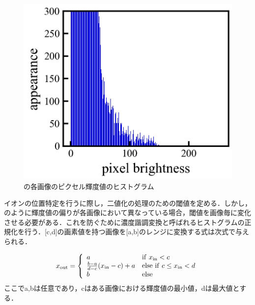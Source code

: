 \begin{figure}[h]
\begin{center}
\begin{minipage}{0.3\linewidth}
		\end{minipage}
		\begin{minipage}{0.3\linewidth}
			\includegraphics[width=0.98\columnwidth]{./theory/figure/5/hist_2.jpg}
		\end{minipage}
	\end{center}
	\caption{の各画像のピクセル輝度値のヒストグラム}
	\label{fig:hist}
\end{figure}

イオンの位置特定を行うに際し，二値化の処理のための閾値を定める．しかし，のように輝度値の偏りが各画像において異なっている場合，閾値を画像毎に変化させる必要がある．これを防ぐために濃度諧調変換と呼ばれるヒストグラムの正規化を行う．[c,d]の画素値を持つ画像を[a,b]のレンジに変換する式は次式で与えられる．

\large
\begin{align}\label{eq:GS_trans}
x_{\rm out} = 
\left\{ 
\begin{array}{ll}
	a & {\rm if} \ x_{\rm in} < c \\
	\frac{b-a}{d-c}(x_{\rm in}-c) + a & {\rm else \ if} \ c \leq x_{\rm in} < d \\
	b &{\rm else}
\end{array} \right.
\end{align}
\normalsize
ここでa,bは任意であり，cはある画像における輝度値の最小値，dは最大値とする．

